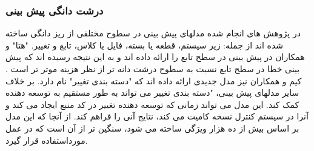 \subsubsection{درشت دانگی پیش بینی }
در پژوهش های انجام شده مدلهای پیش بینی در سطوح مختلفی از ریز دانگی ساخته شده اند از جمله: زیر سیستم، قطعه یا بسته، فایل یا کلاس، تابع و تغییر. "هتا" و همکاران در پیش بینی در سطح تابع را ارائه داده اند و به این نتیجه رسیده اند که پیش بینی خطا در سطح تابع نسبت به سطوح درشت دانه تر از نظر هزینه موثر تر است \cite{hata2012bug}. کیم و همکاران نیز مدل جدیدی ارائه داده اند که "دسته بندی تغییر"  نام دارد. بر خلاف سایر مدلهای پیش بینی، "دسته بندی تغییر می تواند به طور مستقیم به توسعه دهنده کمک کند. این مدل می تواند زمانی که توسعه دهنده تغییر در کد منبع ایجاد می کند و آنرا در سیستم کنترل نسخه کامیت می کند، نتایج آنی را فراهم کند.  از آنجا که این مدل بر اساس بیش از ده هزار ویژگی ساخته می شود، سنگین تر از آن است که در عمل مورداستفاده قرار گیرد\cite{kim2008classifying}. \\


